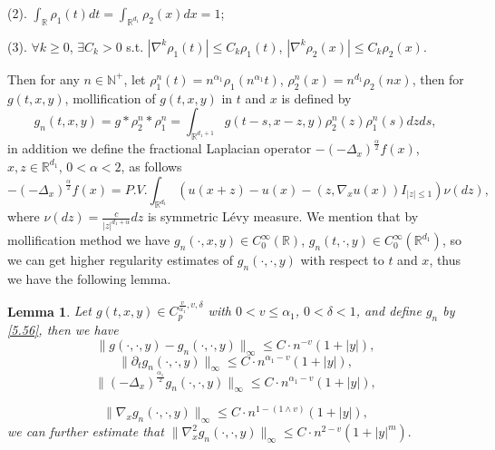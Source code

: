 \documentclass[11pt,reqno]{amsart}
\newtheorem{lemma}{\indent Lemma}[section]
\numberwithin{equation}{section}
\begin{document}
(2). $\int_{\mathbb{R}}\rho_{1}(t)dt=\int_{\mathbb{R}^{ d_{1}}}\rho_{2}(x)dx=1$;

(3). $\forall k\geq 0$, $\exists C_{k}>0$ s.t. $|\nabla^{k}\rho_{1}(t)|\leq C_{k}\rho_{1}(t)$, $|\nabla^{k}\rho_{2}(x)|\leq C_{k}\rho_{2}(x)$.

Then for any $n\in  \mathbb{N}^{+}$, let $\rho_{1}^{n}(t)=n^{\alpha_{1}}\rho_{1}(n^{\alpha_{1}}t)$, $\rho_{2}^{n}(x)=n^{d_{1}}\rho_{2}(nx)$, then for $g(t,x,y)$, mollification of $g(t,x,y)$ in $t$ and $x$ is defined by
\begin{equation}\label{5.56}
	g_{n}(t,x,y)=g\ast\rho_{2}^{n}\ast\rho_{1}^{n}=\int_{\mathbb{R}^{ d_{1}+1}}g(t-s, x-z, y)\rho_{2}^{n}(z)\rho_{1}^{n}(s)dzds,
\end{equation} 
in addition we define the fractional Laplacian operator  $-(-\Delta_{x})^{\frac{\alpha}{2}}f(x)$, $x,z\in \mathbb{R}^{d_{1}}$,  $0<\alpha<2$, as follows 
\begin{equation}\label{5.56-1}
	-(-\Delta_{x})^{\frac{\alpha}{2}}f(x)=P.V.\int_{\mathbb{R}^{d_{1}}}(u(x+z)-u(x)-(z,\nabla_{x}u(x))I_{|z|\leq1})\nu(dz),
\end{equation} 
where $\nu(dz)=\frac{c}{|z|^{d_{1}
		+\alpha}}dz$ is symmetric L\'{e}vy measure.
We mention that by mollification method we have $g_{n}(\cdot,x,y)\in  C_{0}^{\infty}(\mathbb{R})$, $g_{n}(t,\cdot,y)\in  C_{0}^{\infty}(\mathbb{R}^{ d_{1}})$, so we can get higher regularity estimates of $g_{n}(\cdot,\cdot,y)$ with respect to $t$ and $x$, thus we have the following lemma.
\begin{lemma}\label{L51}
	Let $g(t,x,y)\in C_{p}^{\frac{v}{\alpha_{1}}, v,\delta }$ with $0<v\leq\alpha_{1}$, $0<\delta<1$, and %
	 define $g_{n}$ by \eqref{5.56},  then we have 
	\begin{equation}\label{5.57}
		\|g(\cdot,\cdot,y)-g_{n}(\cdot,\cdot,y)\|_{\infty}\leq C\cdot n^{-v}(1+|y|),
	\end{equation} 
	\begin{equation}\label{5.58-1}
		\|\partial_{t}g_{n}(\cdot,\cdot,y)\|_{\infty}\leq C\cdot n^{\alpha_{1}-v}(1+|y|), 
			\end{equation} 
		\begin{equation}\label{5.58-4}
				\|(-\Delta_{x})^{\frac{\alpha_{1}}{2}}g_{n}(\cdot,\cdot,y)\|_{\infty}\leq C\cdot n^{\alpha_{1}-v}(1+|y|),
			\end{equation} 

				\begin{equation}\label{5.58-3}
		\|\nabla_{x}g_ {n}(\cdot,\cdot,y)\|_{\infty}\leq C\cdot n^{1-(1\wedge v)}(1+|y|),
	\end{equation} 
	we can further estimate that $ 	 \|\nabla_{x}^{2}g_{n}(\cdot,\cdot,y)\|_{\infty}\leq C\cdot n^{2-v}(1+|y|^{m}).$
\end{lemma}
\end{document}
